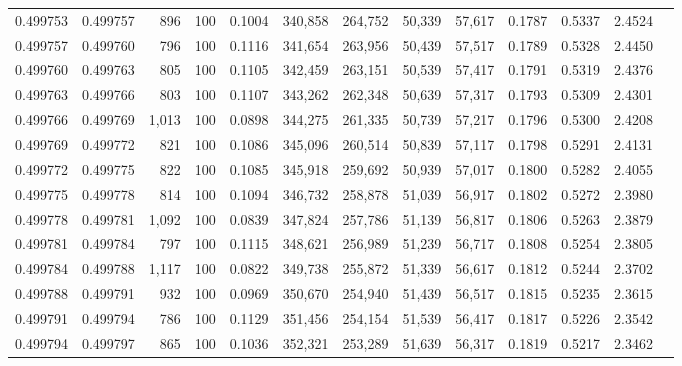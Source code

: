 \begin{tabular}{rrrrrrrrrrrrr}
0.499753 & 0.499757 &   896 & 100 &                                     0.1004 & 340,858 & 264,752 &  50,339 &  57,617 & 0.1787 & 0.5337 & 2.4524 \\
0.499757 & 0.499760 &   796 & 100 &                                     0.1116 & 341,654 & 263,956 &  50,439 &  57,517 & 0.1789 & 0.5328 & 2.4450 \\
0.499760 & 0.499763 &   805 & 100 &                                     0.1105 & 342,459 & 263,151 &  50,539 &  57,417 & 0.1791 & 0.5319 & 2.4376 \\
0.499763 & 0.499766 &   803 & 100 &                                     0.1107 & 343,262 & 262,348 &  50,639 &  57,317 & 0.1793 & 0.5309 & 2.4301 \\
0.499766 & 0.499769 & 1,013 & 100 &                                     0.0898 & 344,275 & 261,335 &  50,739 &  57,217 & 0.1796 & 0.5300 & 2.4208 \\
0.499769 & 0.499772 &   821 & 100 &                                     0.1086 & 345,096 & 260,514 &  50,839 &  57,117 & 0.1798 & 0.5291 & 2.4131 \\
0.499772 & 0.499775 &   822 & 100 &                                     0.1085 & 345,918 & 259,692 &  50,939 &  57,017 & 0.1800 & 0.5282 & 2.4055 \\
0.499775 & 0.499778 &   814 & 100 &                                     0.1094 & 346,732 & 258,878 &  51,039 &  56,917 & 0.1802 & 0.5272 & 2.3980 \\
0.499778 & 0.499781 & 1,092 & 100 &                                     0.0839 & 347,824 & 257,786 &  51,139 &  56,817 & 0.1806 & 0.5263 & 2.3879 \\
0.499781 & 0.499784 &   797 & 100 &                                     0.1115 & 348,621 & 256,989 &  51,239 &  56,717 & 0.1808 & 0.5254 & 2.3805 \\
0.499784 & 0.499788 & 1,117 & 100 &                                     0.0822 & 349,738 & 255,872 &  51,339 &  56,617 & 0.1812 & 0.5244 & 2.3702 \\
0.499788 & 0.499791 &   932 & 100 &                                     0.0969 & 350,670 & 254,940 &  51,439 &  56,517 & 0.1815 & 0.5235 & 2.3615 \\
0.499791 & 0.499794 &   786 & 100 &                                     0.1129 & 351,456 & 254,154 &  51,539 &  56,417 & 0.1817 & 0.5226 & 2.3542 \\
0.499794 & 0.499797 &   865 & 100 &                                     0.1036 & 352,321 & 253,289 &  51,639 &  56,317 & 0.1819 & 0.5217 & 2.3462 \\

\end{tabular}
